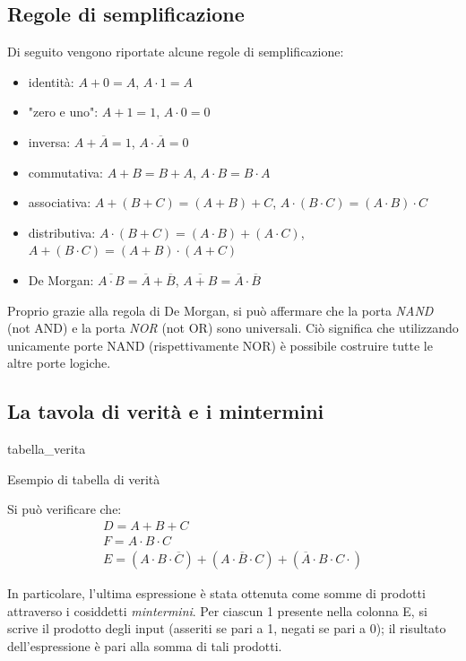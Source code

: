 \documentclass[class=book, crop=false, oneside]{standalone}
\begin{document}
\subsection{Regole di semplificazione}
\label{subsec:semplificazione}
Di seguito vengono riportate alcune regole di semplificazione:
\begin{itemize}
	\item identità: \(A+0=A\), \(A\cdot 1=A\)
	\item "zero e uno": \(A+1=1\), \(A\cdot 0=0\)
	\item inversa: \(A+\overline{A}=1\), \(A\cdot\overline{A}=0\)
	\item commutativa: \(A+B=B+A\), \(A\cdot B=B\cdot A\)
	\item associativa: \(A+(B+C)=(A+B)+C\), \(A\cdot(B\cdot C)=(A\cdot B)\cdot C\)
	\item distributiva: \(A\cdot(B+C)=(A\cdot B)+(A\cdot C)\), \(A+(B\cdot C)=(A+B)\cdot(A+C)\)
	\item De Morgan: \(\overline{A\cdot B} = \overline{A}+\overline{B}\), \(\overline{A+B} = \overline{A}\cdot\overline{B}\)
\end{itemize}
Proprio grazie alla regola di De Morgan, si può affermare che la porta \emph{NAND} (not AND) e la porta \emph{NOR} (not OR) sono universali. Ciò significa che utilizzando unicamente porte NAND (rispettivamente NOR) è possibile costruire tutte le altre porte logiche.

\subsection{La tavola di verità e i mintermini}
\label{subsec:mintermini}
\begin{table}[!h]
	\centering
	{tabella_verita}
	\caption{Esempio di tabella di verità}
	\label{tabella-verita}
\end{table}
Si può verificare che:
\begin{gather*}
D = A+B+C\\
F = A\cdot B\cdot C\\
E = (A\cdot B\cdot\overline{C}) + (A\cdot \overline{B} \cdot C) + (\overline{A} \cdot B\cdot C\cdot)
\end{gather*}

In particolare, l'ultima espressione è stata ottenuta come somme di prodotti attraverso i cosiddetti \emph{mintermini}. Per ciascun 1 presente nella colonna E, si scrive il prodotto degli input (asseriti se pari a 1, negati se pari a 0); il risultato dell'espressione è pari alla somma di tali prodotti.
\end{document}
